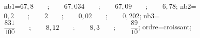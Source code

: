 \documentclass[exercice]{thedocument}%
\begin{document}
%
    \>nb1={$67,8\qquad;\qquad67,034\qquad;\qquad67,09\qquad;\qquad6,78$};%
    \>nb2={$0,2\qquad;\qquad2\qquad;\qquad0,02\qquad;\qquad0,202$};%
    \>nb3={$\dfrac{831}{100}\qquad;\qquad8,12\qquad;\qquad8,3\qquad;\qquad\dfrac{89}{10}$};%
    \>ordre=croissant;%
\end{document}
